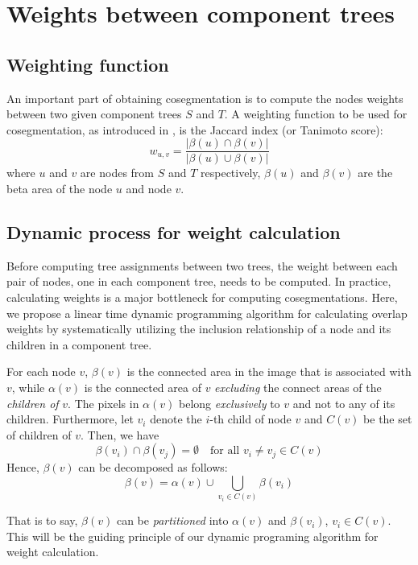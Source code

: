 \section{Weights between component trees}
\subsection{Weighting function}
An important part of obtaining cosegmentation is to compute the nodes weights between two given component trees $S$ and $T$. A weighting function to be used for cosegmentation, as introduced in \cite{Xiao:2011, xiao2011dynamic}, is the Jaccard index (or Tanimoto score):
$$
w_{u,v} = \frac{|\beta(u) \cap \beta(v)|}{|\beta(u) \cup \beta(v)|}
$$
where $u$ and $v$ are nodes from $S$ and $T$ respectively, $\beta(u)$ and $\beta(v)$ are the beta area of the node $u$ and node $v$.

\subsection{Dynamic process for weight calculation}
Before computing tree assignments between two trees, the weight between each pair of nodes, one in each component tree, needs to be computed. In practice, calculating weights is a major bottleneck for computing cosegmentations. Here, we propose a linear time dynamic programming algorithm for calculating overlap weights by systematically utilizing the inclusion relationship of a node and its children in a component tree.

For each node $v$, $\beta(v)$ is the connected area in the image that is
associated with $v$, while $\alpha(v)$ is the connected area of $v$
\emph{excluding} the connect areas of the \emph{children of} $v$. The 
pixels in $\alpha(v)$ belong \emph{exclusively} to $v$ and not to any of its
children. Furthermore, let $v_i$ denote the $i$-th child of node $v$ and
$C(v)$ be the set of children of $v$. Then, we have
\begin{equation*} \label{eqn:beta-disjoint}
\beta(v_i)\cap\beta(v_j)=\emptyset\quad\mbox{for all $v_i\neq v_j\in C(v)$}
\end{equation*}
Hence, $\beta(v)$ can be decomposed as follows:
\begin{equation*} \label{eqn:beta-decompose}
\beta(v) = \alpha(v)\cup\bigcup_{v_i \in C(v)} \beta(v_i)   
\end{equation*}

That is to say, $\beta(v)$ can be \emph{partitioned} into $\alpha(v)$ and
$\beta(v_i)$, $v_i \in C(v)$.  This will be the guiding principle of our
dynamic programing algorithm for weight calculation.

